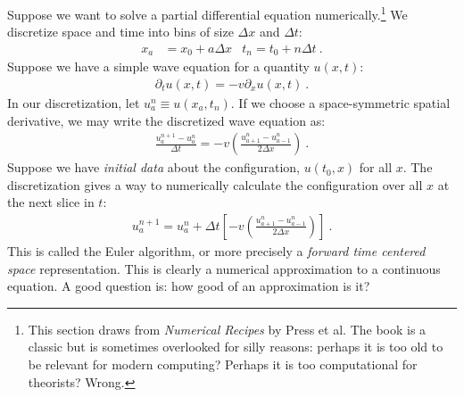 Suppose we want to solve a partial differential equation numerically.\footnote{This section draws from \emph{Numerical Recipes} by Press et al. The book is a classic but is sometimes overlooked for silly reasons: perhaps it is too old to be relevant for modern computing? Perhaps it is too computational for theorists? Wrong.} We discretize space and time into bins of size $\Delta x$ and $\Delta t$:
\begin{align}
  x_a &= x_0 + a\Delta x & t_n = t_0 + n\Delta t \ .
\end{align}
Suppose we have a simple wave equation for a quantity $u(x,t)$:
\begin{align}
  \partial_t u(x,t)= - v\partial_x u(x,t) \ .
\end{align}
In our discretization, let $u^n_a\equiv u(x_a,t_n)$.
If we choose a space-symmetric spatial derivative, we may write the discretized wave equation as:
\begin{align}
\frac{u^{n+1}_a - u^{n}_a}{\Delta t}
=
-v\left(\frac{u^n_{a+1}-u^n_{a-1}}{2\Delta x}\right) \ .
\end{align}
Suppose we have \emph{initial data} about the configuration, $u(t_0, x)$ for all $x$. The discretization gives a way to numerically calculate the configuration over all $x$ at the next slice in $t$:
\begin{align}
  u_a^{n+1} = u^n_a 
  + \Delta t
  \left[-v\left(\frac{u^n_{a+1}-u^n_{a-1}}{2\Delta x}\right)\right] \ .
  \label{eq:FTCS}
\end{align}
This is called the Euler algorithm, or more precisely a \emph{forward time centered space} representation. This is clearly a numerical approximation to a continuous equation. A good question is: how good of an approximation is it?

